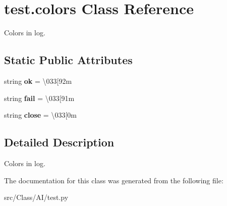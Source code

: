 \hypertarget{classtest_1_1colors}{}\section{test.\+colors Class Reference}
\label{classtest_1_1colors}


Colors in log.  


\subsection*{Static Public Attributes}
\begin{DoxyCompactItemize}
\item 
\mbox{\label{classtest_1_1colors_ace35b345b99f33844d74eafe2d72e085}} 
string {\bfseries ok} = \textquotesingle{}\textbackslash{}033\mbox{[}92m\textquotesingle{}
\item 
\mbox{\label{classtest_1_1colors_a4731e7f2bc33e4de319dd38cd6f489a5}} 
string {\bfseries fail} = \textquotesingle{}\textbackslash{}033\mbox{[}91m\textquotesingle{}
\item 
\mbox{\label{classtest_1_1colors_a1e5b1514c5e345ff2dc7be4357b37bce}} 
string {\bfseries close} = \textquotesingle{}\textbackslash{}033\mbox{[}0m\textquotesingle{}
\end{DoxyCompactItemize}


\subsection{Detailed Description}
Colors in log. 

The documentation for this class was generated from the following file\+:\begin{DoxyCompactItemize}
\item 
src/\+Class/\+A\+I/test.\+py\end{DoxyCompactItemize}
